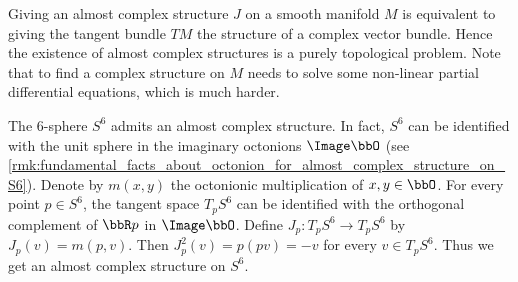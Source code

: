 Giving an almost complex structure \(J\) on a smooth manifold \(M\) is equivalent to giving the tangent bundle \(TM\) the structure of a complex vector bundle.
Hence the existence of almost complex structures is a purely topological problem.
Note that to find a complex structure on \(M\) needs to solve some non-linear partial differential equations, which is much harder.

\begin{example}\label{eg:almost_complex_structure_on_S6}
	The \(6\)-sphere \(S^6\) admits an almost complex structure.
	In fact, \(S^6\) can be identified with the unit sphere in the imaginary octonions \(\Image \bbO\) (see \cref{rmk:fundamental_facts_about_octonion_for_almost_complex_structure_on_S6}).
	Denote by \(m(x,y)\) the octonionic multiplication of \(x,y\in \bbO\).
	For every point \(p\in S^6\), the tangent space \(T_pS^6\) can be identified with the orthogonal complement of \(\bbR p\) in \(\Image \bbO\).
	Define \(J_p: T_pS^6 \to T_pS^6\) by \(J_p(v) = m(p,v)\).
	Then \(J_p^2(v) = p(pv) = -v\) for every \(v\in T_pS^6\).
	Thus we get an almost complex structure on \(S^6\).
\end{example}
